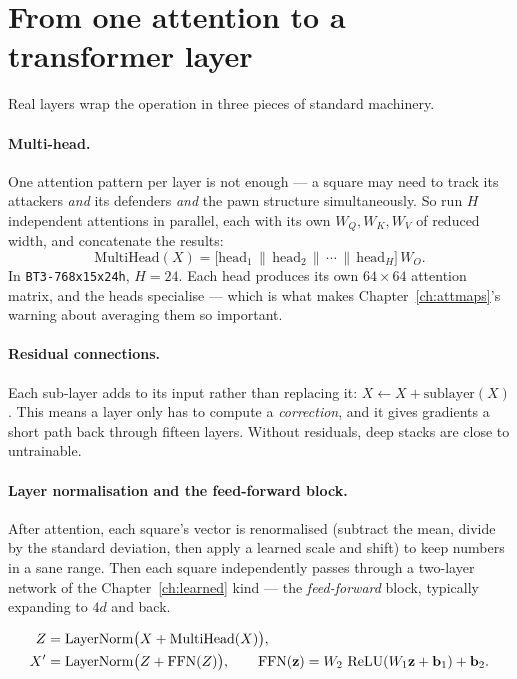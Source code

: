\section{From one attention to a transformer layer}

Real layers wrap the operation in three pieces of standard machinery.

\paragraph{Multi-head.} One attention pattern per layer is not enough --- a square may need to
track its attackers \emph{and} its defenders \emph{and} the pawn structure simultaneously.
So run $H$ independent attentions in parallel, each with its own $W_Q, W_K, W_V$ of reduced
width, and concatenate the results:
\begin{equation}
  \label{eq:multihead}
  \text{MultiHead}(X) = \bigl[\text{head}_1 \,\|\, \text{head}_2 \,\|\, \cdots \,\|\,
  \text{head}_H\bigr]\,W_O .
\end{equation}
In \texttt{BT3-768x15x24h}, $H = 24$. Each head produces its own $64\times64$ attention
matrix, and the heads specialise --- which is what makes Chapter~\ref{ch:attmaps}'s warning
about averaging them so important.

\paragraph{Residual connections.} Each sub-layer adds to its input rather than replacing it:
$X \leftarrow X + \text{sublayer}(X)$. This means a layer only has to compute a
\emph{correction}, and it gives gradients a short path back through fifteen layers. Without
residuals, deep stacks are close to untrainable.

\paragraph{Layer normalisation and the feed-forward block.} After attention, each square's
vector is renormalised (subtract the mean, divide by the standard deviation, then apply a
learned scale and shift) to keep numbers in a sane range. Then each square independently
passes through a two-layer network of the Chapter~\ref{ch:learned} kind --- the
\emph{feed-forward} block, typically expanding to $4d$ and back.

\begin{finalform}
\begin{align}
  Z &= \operatorname{LayerNorm}\bigl(X + \text{MultiHead}(X)\bigr), \label{eq:enc1}\\
  X' &= \operatorname{LayerNorm}\bigl(Z + \text{FFN}(Z)\bigr), \qquad
  \text{FFN}(\mathbf{z}) = W_2\,\operatorname{ReLU}(W_1\mathbf{z} + \mathbf{b}_1) + \mathbf{b}_2 . \label{eq:enc2}
\end{align}
\end{finalform}

